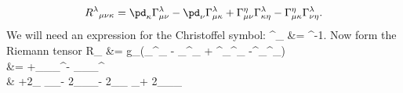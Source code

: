 \documentclass[10pt,letterpaper]{article}
\begin{document}
\[
	R^\lambda{}_{\mu\nu\kappa} = \pd_\kappa \Gamma^\lambda_{\mu\nu} - \pd_\nu \Gamma^\lambda_{\mu\kappa} + \Gamma^\eta_{\mu\nu}\Gamma^\lambda_{\kappa\eta}
	-\Gamma^\eta_{\mu\kappa}\Gamma^\lambda_{\nu\eta}.
\]
We will need an expression for the Christoffel symbol:
\ba
	\Gamma^\lambda_{\mu\nu} 
	&= \Omega^{-1}.
\ea
Now form the Riemann tensor
\ba
		R_{\lambda\mu\nu\kappa} &= g_{\lambda\rho}(\pd_\kappa \Gamma^\rho_{\mu\nu} - \pd_\nu \Gamma^\rho_{\mu\kappa} + \Gamma^\eta_{\mu\nu}\Gamma^\rho_{\kappa\eta}
	-\Gamma^\eta_{\mu\kappa}\Gamma^\rho_{\nu\eta})\\
	&= \Omega\plr{ \eta_{\lambda\nu} \pd_\mu \pd_\kappa \Omega + \eta_{\kappa\mu}\pd_\nu\pd_\lambda \Omega - \eta_{\mu\nu}\pd_\lambda\pd_\kappa \Omega -\eta_{\kappa\lambda}\pd_\mu\pd_\nu \Omega}+\eta_{\mu\kappa}\eta_{\lambda\nu}\pd_\alpha \Omega \pd^\alpha \Omega - \eta_{\kappa\lambda}\eta_{\mu\nu}\pd_\alpha \Omega\pd^\alpha\Omega\\
	&\quad
	+2\eta_{\mu\nu} \pd_\kappa \Omega\pd_\lambda\Omega - 2\eta_{\lambda\nu}\pd_\kappa \Omega \pd_\mu\Omega - 2\eta_{\kappa\mu}\pd_\lambda \Omega
	\pd_\nu\Omega + 2\eta_{\kappa\lambda}\pd_\mu \Omega \pd_\nu\Omega
\ea
\end{document}
